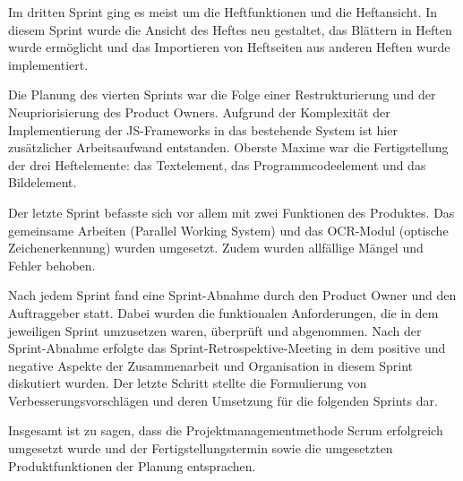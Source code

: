 
Im dritten Sprint ging es meist um die Heftfunktionen und die Heftansicht. In diesem Sprint wurde die Ansicht des Heftes neu gestaltet, das Blättern in Heften wurde ermöglicht und das Importieren von Heftseiten aus anderen Heften wurde implementiert.


\newpage

Die Planung des vierten Sprints war die Folge einer Restrukturierung und der Neupriorisierung des Product Owners. Aufgrund der Komplexität der Implementierung der JS-Frameworks in das bestehende System ist hier zusätzlicher Arbeitsaufwand entstanden. Oberste Maxime war die Fertigstellung der drei Heftelemente: das Textelement, das Programmcodeelement und das Bildelement.

Der letzte Sprint befasste sich vor allem mit zwei Funktionen des Produktes. Das gemeinsame Arbeiten (Parallel Working System) und das OCR-Modul (optische Zeichenerkennung) wurden umgesetzt. Zudem wurden allfällige Mängel und Fehler behoben.


Nach jedem Sprint fand eine Sprint-Abnahme durch den Product Owner und den Auftraggeber statt. Dabei wurden die funktionalen Anforderungen, die in dem jeweiligen Sprint umzusetzen waren, überprüft und abgenommen. Nach der Sprint-Abnahme erfolgte das Sprint-Retrospektive-Meeting in dem positive und negative Aspekte der Zusammenarbeit und Organisation in diesem Sprint diskutiert wurden. Der letzte Schritt stellte die Formulierung von Verbesserungsvorschlägen und deren Umsetzung für die folgenden Sprints dar.

Insgesamt ist zu sagen, dass die Projektmanagementmethode Scrum erfolgreich umgesetzt wurde und der Fertigstellungstermin sowie die umgesetzten Produktfunktionen der Planung entsprachen.
